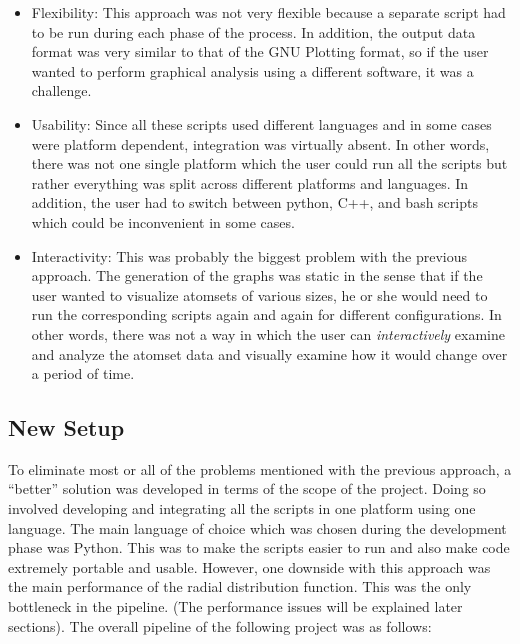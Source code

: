 \begin{itemize}
    \item Flexibility: This approach was not very flexible because a separate script had to be run during each phase of the process. In addition, the output data format was very similar to that of the GNU Plotting format, so if the user wanted to perform graphical analysis using a different software, it was a challenge.
    
    \item Usability: Since all these scripts used different languages and in some cases were platform dependent, integration was virtually absent. In other words, there was not one single platform which the user could run all the scripts but rather everything was split across different platforms and languages. In addition, the user had to switch between python, C++, and bash scripts which could be inconvenient in some cases. 
    
    \item Interactivity: This was probably the biggest problem with the previous approach. The generation of the graphs was static in the sense that if the user wanted to visualize atomsets of various sizes, he or she would need to run the corresponding scripts again and again for different configurations. In other words, there was not a way in which the user can \textit{interactively} examine and analyze the atomset data and visually examine how it would change over a period of time.
\end{itemize}

\subsection*{New Setup}

To eliminate most or all of the problems mentioned with the previous approach, a ``better'' solution was developed in terms of the scope of the project. Doing so involved developing and integrating all the scripts in one platform using one language. The main language of choice which was chosen during the development phase was Python. This was to make the scripts easier to run and also make code extremely portable and usable. However, one downside with this approach was the main performance of the radial distribution function. This was the only bottleneck in the pipeline. (The performance issues will be explained later sections). The overall pipeline of the following project was as follows:



